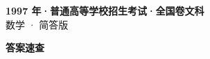\documentclass[zihao=-4, a4paper]{ctexart}
\begin{document}
\begin{center}
  {\Large\bfseries 1997 年·普通高等学校招生考试·全国卷文科}\\[4pt]
  {\large 数学 · 简答版}
\end{center}
\medskip
{}

\clearpage
{}
\begin{center}{\Large\bfseries 答案速查}\end{center}
\medskip

\end{document}
